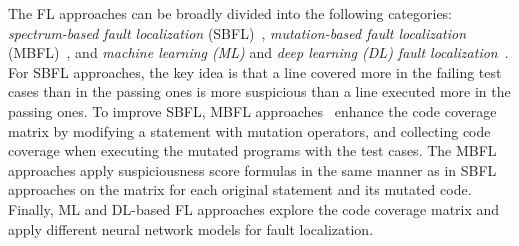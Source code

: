 The FL approaches can be broadly divided into the following
categories: {\em spectrum-based fault localization}
(SBFL)~\cite{abreu2006evaluation,jones2001visualization,keller2017critical},
{\em mutation-based fault localization}
(MBFL)~\cite{MUSE,papadakis2012using,Metallaxis}, and {\em machine
  learning (ML)} and {\em deep learning (DL) fault
  localization}~\cite{DeepFL,icse21-fl}.  For SBFL approaches, the key
idea is that a line covered more in the failing test cases than in the
passing ones is more suspicious than a line executed more in the
passing ones. To improve SBFL, MBFL
approaches~\cite{MUSE,papadakis2012using,Metallaxis} enhance the code
coverage matrix by modifying a statement with mutation operators,
and collecting code coverage when executing the mutated programs with
the test cases. The MBFL approaches apply suspiciousness score
formulas in the same manner as in SBFL approaches on the matrix for
each original statement and its mutated code. Finally, ML and DL-based
FL approaches explore the code coverage matrix and apply different
neural network models for fault localization.




